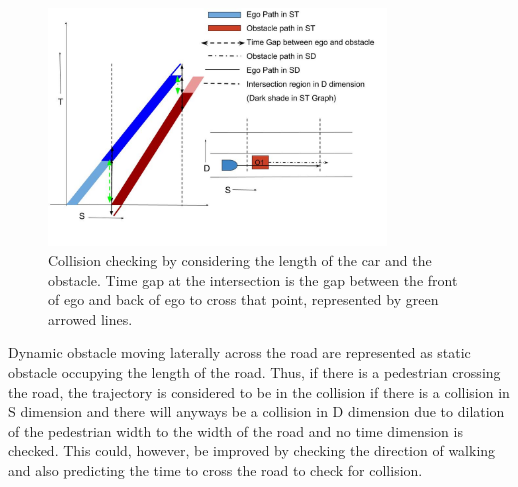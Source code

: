\begin{figure}
	\centering
	\includegraphics[width=0.8\textwidth]{Images/concept/dynamic_obst_widths.jpg}
	\caption{Collision checking by considering the length of the car and the obstacle. Time gap at the intersection is the gap between the front of ego and back of ego to cross that point, represented by green arrowed lines.}
	\label{dynamic_widths}
\end{figure}

Dynamic obstacle moving laterally across the road are represented as static obstacle occupying the length of the road. Thus, if there is a pedestrian crossing the road, the trajectory is considered to be in the collision if there is a collision in S dimension and there will anyways be a collision in D dimension due to dilation of the pedestrian width to the width of the road and no time dimension is checked. This could, however, be improved by checking the direction of walking and also predicting the time to cross the road to check for collision. 

